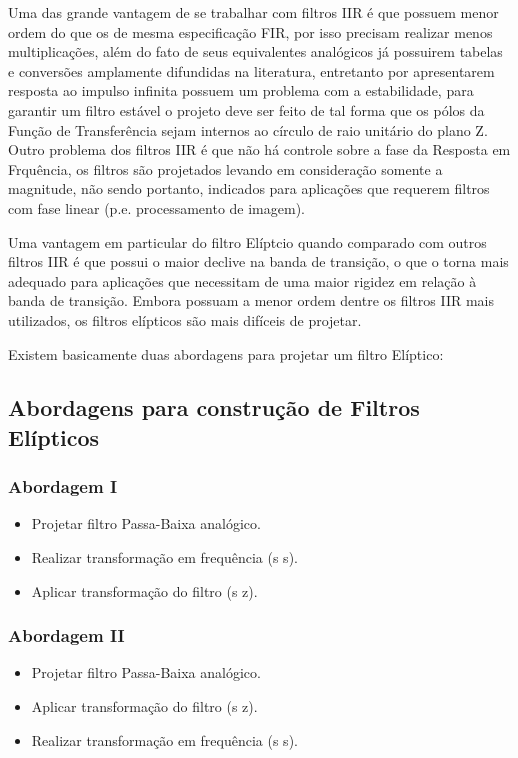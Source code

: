 \documentclass[a4paper,10pt]{article}
\begin{document}
Uma das grande vantagem de se trabalhar com filtros IIR é que possuem menor ordem do que os de mesma especificação FIR, por isso precisam realizar menos multiplicações, além do fato de seus equivalentes analógicos já possuirem tabelas e conversões amplamente difundidas na literatura, entretanto por apresentarem resposta ao impulso infinita possuem um problema com a estabilidade, para garantir um filtro estável o projeto deve ser feito de tal forma que os pólos da Função de Transferência  sejam internos ao círculo de raio unitário do plano Z. Outro problema dos filtros IIR é que não há controle sobre a fase da Resposta em Frquência, os filtros são projetados levando em consideração somente a magnitude, não sendo portanto, indicados para aplicações que requerem filtros com fase linear (p.e. processamento de imagem).

Uma vantagem em particular do filtro Elíptcio quando comparado com outros filtros IIR é que possui o maior declive na banda de transição, o que o torna mais adequado para aplicações que necessitam de uma maior rigidez em relação à banda de transição. Embora possuam a menor ordem dentre os filtros IIR mais utilizados, os filtros elípticos são mais difíceis de projetar.

Existem basicamente duas abordagens para projetar um filtro Elíptico:

\subsection{Abordagens para construção de Filtros Elípticos}
\subsubsection{Abordagem I}
	\begin{itemize}
		\item Projetar filtro Passa-Baixa analógico.
	\end{itemize}
	\begin{itemize}
,		\item Realizar transformação em frequência (s \rightarrow s).
	\end{itemize}	
	\begin{itemize}
		\item Aplicar transformação do filtro (s \rightarrow z).
	\end{itemize}

\subsubsection{Abordagem II}
	\begin{itemize}
		\item Projetar filtro Passa-Baixa analógico.
	\end{itemize}
	\begin{itemize}
		\item Aplicar transformação do filtro (s \rightarrow z).	
	\end{itemize}	
	\begin{itemize}
		\item Realizar transformação em frequência (s \rightarrow s).
	\end{itemize}	
	
\end{document}

